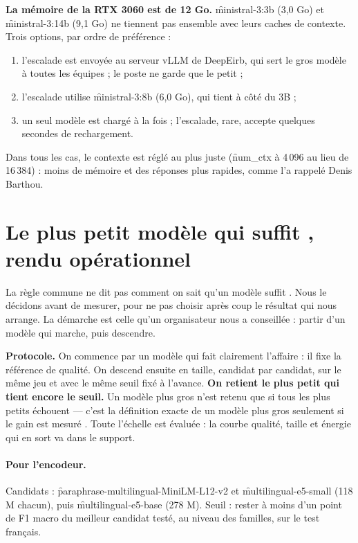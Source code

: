\begin{attention}
\textbf{La mémoire de la RTX 3060 est de 12 Go.} \f{ministral-3:3b} (3,0 Go) et
\f{ministral-3:14b} (9,1 Go) ne tiennent pas ensemble avec leurs caches de contexte. Trois options,
par ordre de préférence :
\begin{enumerate}
  \item l'escalade est envoyée au serveur vLLM de DeepEirb, qui sert le gros modèle à toutes les
        équipes ; le poste ne garde que le petit ;
  \item l'escalade utilise \f{ministral-3:8b} (6,0 Go), qui tient à côté du 3B ;
  \item un seul modèle est chargé à la fois ; l'escalade, rare, accepte quelques secondes de
        rechargement.
\end{enumerate}
Dans tous les cas, le contexte est réglé au plus juste (\f{num\_ctx} à 4\,096 au lieu de 16\,384) :
moins de mémoire et des réponses plus rapides, comme l'a rappelé Denis Barthou.
\end{attention}

\section{\og Le plus petit modèle qui suffit \fg, rendu opérationnel}

La règle commune ne dit pas comment on sait qu'un modèle \og suffit \fg. Nous le décidons avant
de mesurer, pour ne pas choisir après coup le résultat qui nous arrange. La démarche est celle
qu'un organisateur nous a conseillée : partir d'un modèle qui marche, puis descendre.

\begin{cle}
\textbf{Protocole.} On commence par un modèle qui fait clairement l'affaire : il fixe la référence
de qualité. On descend ensuite en taille, candidat par candidat, sur le même jeu et avec le même
seuil fixé à l'avance. \textbf{On retient le plus petit qui tient encore le seuil.} Un modèle plus
gros n'est retenu que si tous les plus petits échouent --- c'est la définition exacte de \og un
modèle plus gros seulement si le gain est mesuré \fg. Toute l'échelle est évaluée : la courbe
qualité, taille et énergie qui en sort va dans le support.
\end{cle}

\paragraph{Pour l'encodeur.} Candidats : \f{paraphrase-multilingual-MiniLM-L12-v2} et
\f{multilingual-e5-small} (118 M chacun), puis \f{multilingual-e5-base} (278 M). Seuil : rester à
moins d'un point de F1 macro du meilleur candidat testé, au niveau des familles, sur le test
français.

